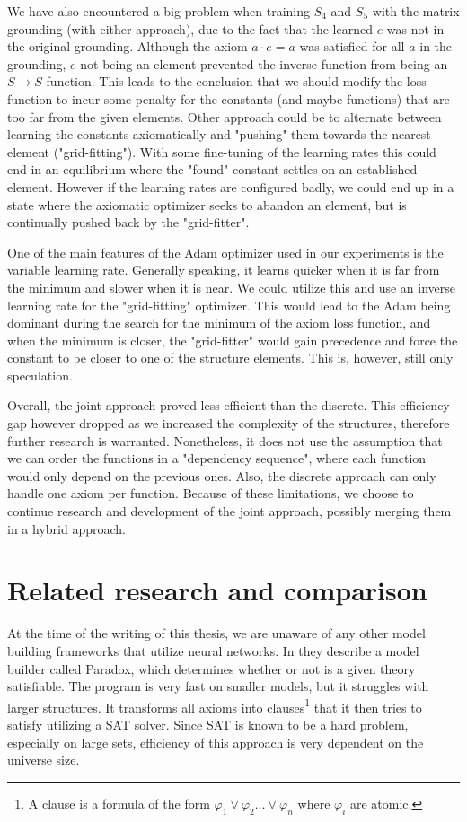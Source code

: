 We have also encountered a big problem when training $S_4$ and $S_5$ with the matrix grounding (with either approach), due to the fact that the learned $e$ was not in the original grounding. Although the axiom $a\cdot e=a$ was satisfied for all $a$ in the grounding, $e$ not being an element prevented the inverse function from being an $S\rightarrow S$ function. This leads to the conclusion that we should modify the loss function to incur some penalty for the constants (and maybe functions) that are too far from the given elements. Other approach could be to alternate between learning the constants axiomatically and "pushing" them towards the nearest element ("grid-fitting"). With some fine-tuning of the learning rates this could end in an equilibrium where the "found" constant settles on an established element. However if the learning rates are configured badly, we could end up in a state where the axiomatic optimizer seeks to abandon an element, but is continually pushed back by the "grid-fitter".

One of the main features of the Adam optimizer used in our experiments is the variable learning rate. Generally speaking, it learns quicker when it is far from the minimum and slower when it is near. We could utilize this and use an inverse learning rate for the "grid-fitting" optimizer. This would lead to the Adam being dominant during the search for the minimum of the axiom loss function, and when the minimum is closer, the "grid-fitter" would gain precedence and force the constant to be closer to one of the structure elements. This is, however, still only speculation.

Overall, the joint approach proved less efficient than the discrete. This efficiency gap however dropped as we increased the complexity of the structures, therefore further research is warranted. Nonetheless, it does not use the assumption that we can order the functions in a "dependency sequence", where each function would only depend on the previous ones. Also, the discrete approach can only handle one axiom per function. Because of these limitations, we choose to continue research and development of the joint approach, possibly merging them in a hybrid approach.

\section*{Related research and comparison}

At the time of the writing of this thesis, we are unaware of any other model building frameworks that utilize neural networks. In \cite{paradox} they describe a model builder called Paradox, which determines whether or not is a given theory satisfiable. The program is very fast on smaller models, but it struggles with larger structures. It transforms all axioms into clauses\footnote{A clause is a formula of the form $\varphi_1\vee \varphi_2\dots\vee \varphi_n$ where $\varphi_i$ are atomic.} that it then tries to satisfy utilizing a SAT solver. Since SAT is known to be a hard problem, especially on large sets, efficiency of this approach is very dependent on the universe size. 

